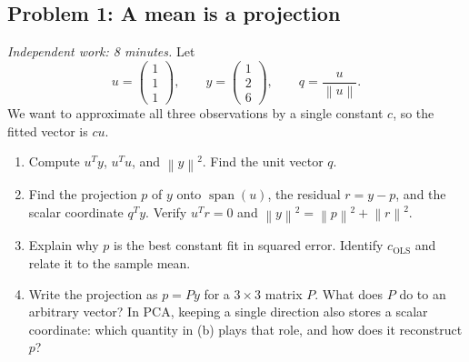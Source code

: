 \documentclass[11pt]{article}
\newcommand{\norm}[1]{\left\lVert#1\right\rVert}
\newcommand{\ols}{\mathrm{OLS}}
\newcommand{\workingspace}[1]{}
\newcommand{\workingspace}[1]{\vspace{#1}}
\begin{document}
\subsection*{Problem 1: A mean is a projection}
\noindent\textit{Independent work: 8 minutes.}
Let
\[
 u=\begin{pmatrix}1\\1\\1\end{pmatrix},\qquad
 y=\begin{pmatrix}1\\2\\6\end{pmatrix},\qquad
 q=\frac{u}{\norm{u}}.
\]
We want to approximate all three observations by a single constant $c$,
so the fitted vector is $cu$.
\begin{enumerate}
 \item Compute $u^Ty$, $u^Tu$, and $\norm{y}^2$. Find the unit vector $q$.
 \item Find the projection $p$ of $y$ onto $\operatorname{span}(u)$,
 the residual $r=y-p$, and the scalar coordinate $q^Ty$.
 Verify $u^Tr=0$ and $\norm{y}^2=\norm{p}^2+\norm{r}^2$.
 \item Explain why $p$ is the best constant fit in squared error.
 Identify $c_{\ols}$ and relate it to the sample mean.
 \item Write the projection as $p=Py$ for a $3\times3$ matrix $P$.
 What does $P$ do to an arbitrary vector? In PCA, keeping a single
 direction also stores a scalar coordinate: which quantity in (b)
 plays that role, and how does it reconstruct $p$?
\end{enumerate}
\workingspace{9cm}
\end{document}
